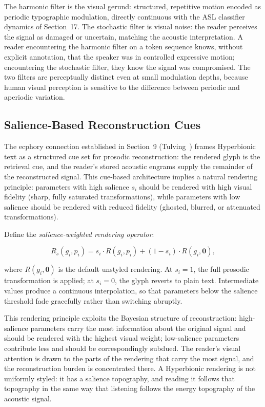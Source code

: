 \documentclass[12pt, a4paper]{article}
\begin{document}
The harmonic filter is the visual gerund: structured, repetitive motion encoded as periodic typographic modulation, directly continuous with the ASL classifier dynamics of Section~17. The stochastic filter is visual noise: the reader perceives the signal as damaged or uncertain, matching the acoustic interpretation. A reader encountering the harmonic filter on a token sequence knows, without explicit annotation, that the speaker was in controlled expressive motion; encountering the stochastic filter, they know the signal was compromised. The two filters are perceptually distinct even at small modulation depths, because human visual perception is sensitive to the difference between periodic and aperiodic variation.

\subsection{Salience-Based Reconstruction Cues}

The ecphory connection established in Section~9 (Tulving~\cite{Tulving1982}) frames Hyperbionic text as a structured cue set for prosodic reconstruction: the rendered glyph is the retrieval cue, and the reader's stored acoustic engrams supply the remainder of the reconstructed signal. This cue-based architecture implies a natural rendering principle: parameters with high salience $s_i$ should be rendered with high visual fidelity (sharp, fully saturated transformations), while parameters with low salience should be rendered with reduced fidelity (ghosted, blurred, or attenuated transformations).

Define the \emph{salience-weighted rendering operator}:

\begin{equation}
R_s(g_i, p_i) = s_i \cdot R(g_i, p_i) + (1 - s_i) \cdot R(g_i, \mathbf{0}),
\label{eq:Rs}
\end{equation}

where $R(g_i, \mathbf{0})$ is the default unstyled rendering. At $s_i = 1$, the full prosodic transformation is applied; at $s_i = 0$, the glyph reverts to plain text. Intermediate values produce a continuous interpolation, so that parameters below the salience threshold fade gracefully rather than switching abruptly.

This rendering principle exploits the Bayesian structure of reconstruction: high-salience parameters carry the most information about the original signal and should be rendered with the highest visual weight; low-salience parameters contribute less and should be correspondingly subdued. The reader's visual attention is drawn to the parts of the rendering that carry the most signal, and the reconstruction burden is concentrated there. A Hyperbionic rendering is not uniformly styled: it has a salience topography, and reading it follows that topography in the same way that listening follows the energy topography of the acoustic signal.
\end{document}
